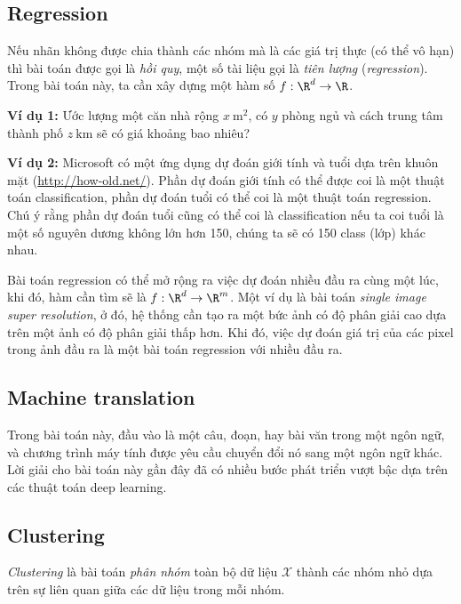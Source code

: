 \subsection{Regression}
Nếu nhãn không được chia thành các nhóm mà là các giá trị thực (có thể vô hạn)
thì bài toán được gọi là \textit{hồi quy}, một số tài liệu gọi là \textit{tiên
lượng} (\textit{regression}). Trong bài toán này, ta
cần xây dựng một hàm số $f: \R^d \rightarrow \R$. 

\textbf{Ví dụ 1:} Ước lượng một căn nhà rộng $x ~ \text{m}^2$, có $y$ phòng ngủ
và cách trung tâm thành phố $z~ \text{km}$ sẽ có giá khoảng bao nhiêu?

\textbf{Ví dụ 2:} Microsoft có một ứng dụng dự đoán giới tính và tuổi dựa trên
khuôn mặt (\url{http://how-old.net/}). Phần dự đoán giới tính có thể được coi là
một thuật toán classification, phần dự đoán tuổi có thể coi là một thuật toán
{regression}. {Chú ý rằng phần dự đoán tuổi cũng có thể coi là {classification}
nếu ta coi tuổi là một số nguyên dương không lớn hơn 150, chúng ta sẽ có 150
class (lớp) khác nhau.}

Bài toán regression có thể mở rộng ra việc dự đoán nhiều đầu ra cùng một lúc,
khi đó, hàm cần tìm sẽ là $f: \R^d \rightarrow \R^m$. Một ví dụ là bài toán
\textit{single image super resolution}, ở đó, hệ thống cần tạo ra một bức ảnh có độ
phân giải cao dựa
trên một ảnh có độ phân giải thấp hơn. Khi đó, việc dự đoán giá trị của các
pixel trong ảnh đầu ra là một bài toán regression với nhiều đầu ra. 




\subsection{Machine translation}

Trong bài toán này, đầu vào là một câu, đoạn, hay bài văn trong một ngôn ngữ,
và
chương trình máy tính được yêu cầu chuyển đổi nó sang một ngôn ngữ khác. Lời
giải cho bài toán này gần đây đã có nhiều bước phát triển vượt bậc dựa trên các
thuật toán deep learning.


\subsection{Clustering}
\textit{Clustering} là bài toán \textit{phân nhóm} toàn bộ dữ liệu $\mathcal{X}$
thành các nhóm nhỏ dựa trên
sự liên quan giữa các dữ liệu trong mỗi nhóm. 

